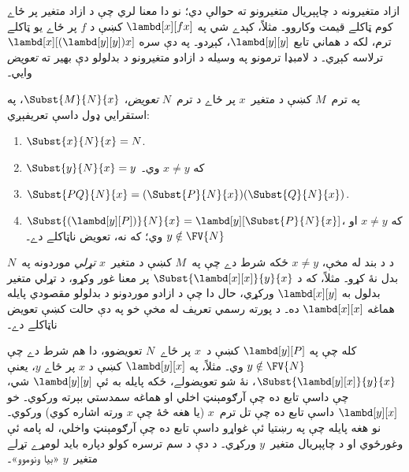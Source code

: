 \documentclass[../../../include/open-logic-section]{subfiles}
\begin{document}

\begin{explain}
ازاد متغيرونه د چاپېريال متغيرونو ته حوالې دي؛ نو دا معنا لري چې د
ازاد متغير پر ځاے کوم ټاکلے قيمت وکاروو۔ مثلاً، کېدے شي په
$\lambd[x][f x]$ کښې د $f$ پر ځاے يو ټاکلے ترم، لکه د هماني تابع
$\lambd[y][y]$، کېږدو۔ په دې سره $\lambd[x][(\lambd[y][y]) x]$
ترلاسه کېږي۔ د لامبډا ترمونو په وسيله د ازادو متغيرونو د بدلولو دې
بهير ته \emph{تعويض} وايي۔
\end{explain}

\begin{defn}[تعويض] 
  په ترم~$M$ کښې د متغير~$x$ پر ځاے د ترم~$N$ \emph{تعويض}،
  $\Subst{M}{N}{x}$، په استقرايي ډول داسې تعريفېږي:
  \begin{enumerate}
    \item $\Subst{x}{N}{x} = N$. 
    \item $\Subst{y}{N}{x}  = y$ که $x \neq y$ وي۔ 
    \item $\Subst{PQ}{N}{x}  = (\Subst{P}{N}{x}) (\Subst{Q}{N}{x})$.
    \item $\Subst{(\lambd[y][P])}{N}{x} = \lambd[y][\Subst{P}{N}{x}]$،
      که $x \neq y$ او $y \notin \FV{N}$ وي؛ که نه، تعويض ناټاکلے دے۔
  \end{enumerate}
\end{defn}

\begin{explain}
د  د  بند له مخې، $x
\neq y$ ځکه شرط دے چې په~$M$ کښې د متغير~$x$ \emph{تړلي} موردونه
په~$N$ بدل نۀ کړو۔ مثلاً، که د
$\Subst{\lambd[x][x]}{y}{x}$ پر معنا غور وکړو، د تړلي متغير بدلول
به $\lambd[x][y]$ ورکړي، حال دا چې د ازادو موردونو د بدلولو
مقصودي پايله هماغه $\lambd[x][x]$ ده۔ د پورته رسمي تعريف له مخې
خو په دې حالت کښې تعويض ناټاکلے دے۔

کله چې په $\lambd[y][P]$ کښې د~$x$ پر ځاے~$N$ تعويضوو، دا هم شرط
دے چې $y \notin \FV{N}$ وي۔ مثلاً، په $\lambd[y][x]$ کښې د $x$
پر ځاے $y$، يعنې $\Subst{\lambd[y][x]}{y}{x}$، نۀ شو تعويضولے،
ځکه پايله به ئې $\lambd[y][y]$ شي، چې داسې تابع ده چې آرګومېنټ
اخلي او هماغه سمدستي بېرته ورکوي۔ خو $\lambd[y][x]$ داسې تابع ده
چې تل ترم~$x$ (يا هغه څۀ چې $x$ ورته اشاره کوي) ورکوي۔ نو هغه
پايله چې په رښتيا ئې غواړو داسې تابع ده چې آرګومېنټ واخلي، له
پامه ئې وغورځوي او د چاپېريال متغير~$y$ ورکړي۔ د دې د سم ترسره
کولو دپاره بايد لومړے تړلے متغير~$y$ «بيا ونوموو»۔
\end{explain}
\end{document}
